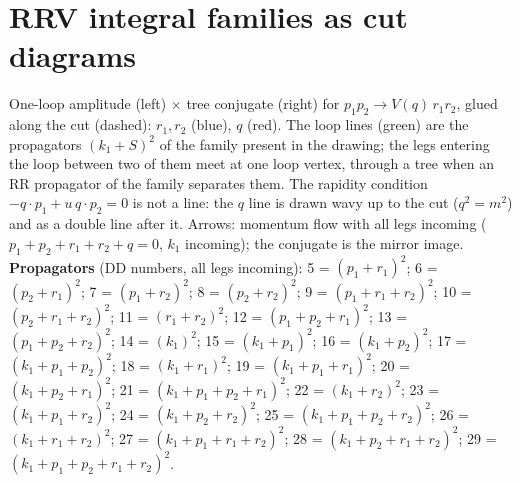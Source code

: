\documentclass[10pt]{article}
\begin{document}
\section*{RRV integral families as cut diagrams}
One-loop amplitude (left) $\times$ tree conjugate (right) for $p_1 p_2 \to V(q)\, r_1 r_2$, glued along the cut (dashed): $r_1, r_2$ (blue), $q$ (red). The loop lines (green) are the propagators $(k_1+S)^2$ of the family present in the drawing; the legs entering the loop between two of them meet at one loop vertex, through a tree when an RR propagator of the family separates them. The rapidity condition $-q\cdot p_1 + u\, q\cdot p_2 = 0$ is not a line: the $q$ line is drawn wavy up to the cut ($q^2 = m^2$) and as a double line after it. Arrows: momentum flow with all legs incoming ($p_1+p_2+r_1+r_2+q=0$, $k_1$ incoming); the conjugate is the mirror image. \textbf{Propagators} (DD numbers, all legs incoming): 5 = $(p_1+r_1)^2$; 6 = $(p_2+r_1)^2$; 7 = $(p_1+r_2)^2$; 8 = $(p_2+r_2)^2$; 9 = $(p_1+r_1+r_2)^2$; 10 = $(p_2+r_1+r_2)^2$; 11 = $(r_1+r_2)^2$; 12 = $(p_1+p_2+r_1)^2$; 13 = $(p_1+p_2+r_2)^2$; 14 = $(k_1)^2$; 15 = $(k_1+p_1)^2$; 16 = $(k_1+p_2)^2$; 17 = $(k_1+p_1+p_2)^2$; 18 = $(k_1+r_1)^2$; 19 = $(k_1+p_1+r_1)^2$; 20 = $(k_1+p_2+r_1)^2$; 21 = $(k_1+p_1+p_2+r_1)^2$; 22 = $(k_1+r_2)^2$; 23 = $(k_1+p_1+r_2)^2$; 24 = $(k_1+p_2+r_2)^2$; 25 = $(k_1+p_1+p_2+r_2)^2$; 26 = $(k_1+r_1+r_2)^2$; 27 = $(k_1+p_1+r_1+r_2)^2$; 28 = $(k_1+p_2+r_1+r_2)^2$; 29 = $(k_1+p_1+p_2+r_1+r_2)^2$.\par\medskip
\end{document}

